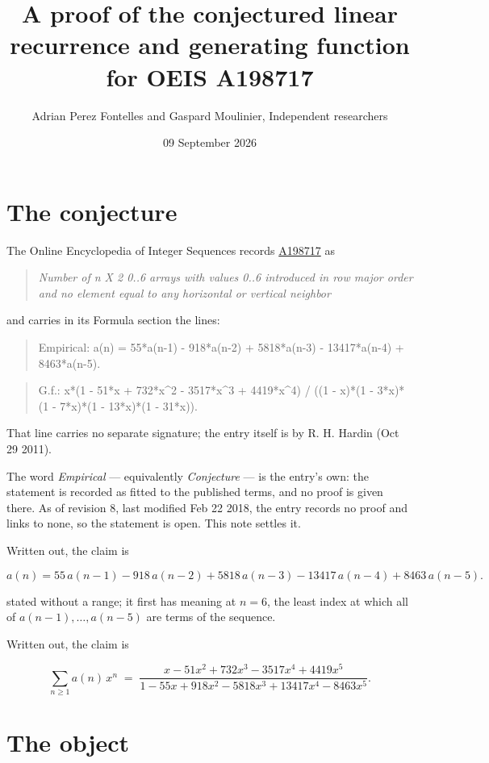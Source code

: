 \documentclass[11pt]{article}
\title{A proof of the conjectured linear recurrence and generating function for OEIS A198717}
\author{Adrian Perez Fontelles and Gaspard Moulinier, Independent researchers}
\date{09 September 2026}
\theoremstyle{definition}
\begin{document}
\maketitle
\section{The conjecture}

The Online Encyclopedia of Integer Sequences records \href{https://oeis.org/A198717}{A198717} as

\begin{quote}\itshape Number of n X 2 0..6 arrays with values 0..6 introduced in row major order and no element equal to any horizontal or vertical neighbor\end{quote}

and carries in its Formula section the lines:

\begin{quote}\ttfamily Empirical: a(n) = 55*a(n-1) - 918*a(n-2) + 5818*a(n-3) - 13417*a(n-4) + 8463*a(n-5).\end{quote}

\begin{quote}\ttfamily G.f.: x*(1 - 51*x + 732*x\textasciicircum{}2 - 3517*x\textasciicircum{}3 + 4419*x\textasciicircum{}4) / ((1 - x)*(1 - 3*x)*(1 - 7*x)*(1 - 13*x)*(1 - 31*x)).\end{quote}

That line carries no separate signature; the entry itself is by R. H. Hardin (Oct 29 2011).

The word {\itshape Empirical} --- equivalently {\itshape Conjecture} --- is the entry's own: the statement is recorded as fitted to the published terms, and no proof is given there. As of revision 8, last modified Feb 22 2018, the entry records no proof and links to none, so the statement is open. This note settles it.

Written out, the claim is

\[a(n) = 55\,a(n-1) - 918\,a(n-2) + 5818\,a(n-3) - 13417\,a(n-4) + 8463\,a(n-5).\]

stated without a range; it first has meaning at $n = 6$, the least index at which all of $a(n-1),\dots,a(n-5)$ are terms of the sequence.

Written out, the claim is

\[\sum_{n \ge 1} a(n)\,x^n \;=\; \frac{x - 51x^{2} + 732x^{3} - 3517x^{4} + 4419x^{5}}{1 - 55x + 918x^{2} - 5818x^{3} + 13417x^{4} - 8463x^{5}}.\]

\section{The object}
\end{document}
